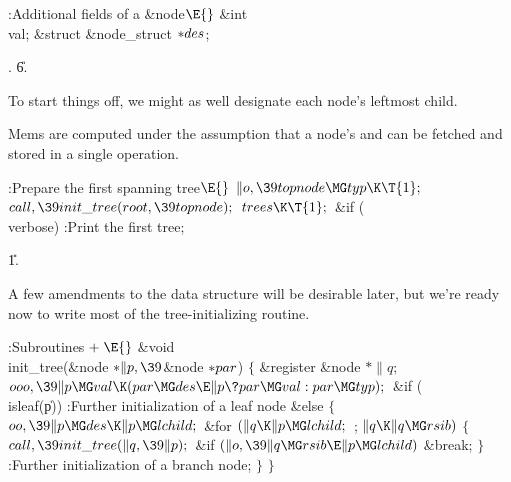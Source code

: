 \Y\B\4:Additional fields of a \&{node}\X${}\E{}$\6
\&{int} \\{val};\6
\&{struct} \&{node\_struct} ${}{*}\\{des}{}$;\par
{}.
\U6.\fi

To start things off, we might as well designate each node's leftmost
child.

Mems are computed under the assumption that a node's  and  can
be fetched and stored in a single operation.

\Y\B\4:Prepare the first spanning tree\X${}\E{}$\6
$\|o,\39\\{topnode}\MG\\{typ}\K\T{1};{}$\6
${}\\{call},\39\\{init\_tree}(\\{root},\39\\{topnode});{}$\6
${}\\{trees}\K\T{1};{}$\6
\&{if} (\\{verbose})\1\5
:Print the first tree\X;\2\par
\U1.\fi

A few amendments to the data structure will be desirable later, but we're
ready now to write most of the tree-initializing routine.

\Y\B\4:Subroutines\X${}\mathrel+\E{}$\6
\&{void} \\{init\_tree}(\&{node} ${}{*}\|p,\39{}$\&{node} ${}{*}\\{par}{}$)\6
${}\{{}$\1\6
\&{register} \&{node} ${}{*}\|q;{}$\7
${}\\{ooo},\39\|p\MG\\{val}\K(\\{par}\MG\\{des}\E\|p\?\\{par}\MG\\{val}:\\{par}%
\MG\\{typ});{}$\6
\&{if} (\\{isleaf}(\|p))\1\5
:Further initialization of a leaf node\X\2\6
\&{else}\5
${}\{{}$\1\6
${}\\{oo},\39\|p\MG\\{des}\K\|p\MG\\{lchild};{}$\6
\&{for} ${}(\|q\K\|p\MG\\{lchild};{}$  ; ${}\|q\K\|q\MG\\{rsib}){}$\5
${}\{{}$\1\6
${}\\{call},\39\\{init\_tree}(\|q,\39\|p);{}$\6
\&{if} ${}(\|o,\39\|q\MG\\{rsib}\E\|p\MG\\{lchild}){}$\1\5
\&{break};\2\6
\4${}\}{}$\2\6
:Further initialization of a branch node\X;\6
\4${}\}{}$\2\6
\4${}\}{}$\2\par
\fi

